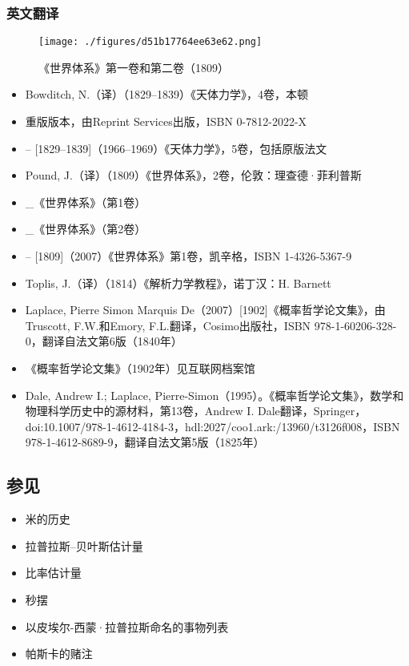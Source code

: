 \subsubsection{英文翻译}
\begin{figure}[ht]
\centering
\texttt{[image: ./figures/d51b17764ee63e62.png]}
\caption{《世界体系》第一卷和第二卷（1809）} \label{fig_LPLS_17}
\end{figure}  
\begin{itemize}
\item Bowditch, N.（译）（1829–1839）《天体力学》，4卷，本顿  
\item 重版版本，由Reprint Services出版，ISBN 0-7812-2022-X  
\item – [1829–1839]（1966–1969）《天体力学》，5卷，包括原版法文  
\item Pound, J.（译）（1809）《世界体系》，2卷，伦敦：理查德·菲利普斯  
\item _《世界体系》（第1卷）  
\item _《世界体系》（第2卷）  
\item – [1809]（2007）《世界体系》第1卷，凯辛格，ISBN 1-4326-5367-9  
\item Toplis, J.（译）（1814）《解析力学教程》，诺丁汉：H. Barnett  
\item Laplace, Pierre Simon Marquis De（2007）[1902]《概率哲学论文集》，由Truscott, F.W.和Emory, F.L.翻译，Cosimo出版社，ISBN 978-1-60206-328-0，翻译自法文第6版（1840年）  
\item 《概率哲学论文集》（1902年）见互联网档案馆  
\item Dale, Andrew I.; Laplace, Pierre-Simon（1995）。《概率哲学论文集》，数学和物理科学历史中的源材料，第13卷，Andrew I. Dale翻译，Springer，doi:10.1007/978-1-4612-4184-3，hdl:2027/coo1.ark:/13960/t3126f008，ISBN 978-1-4612-8689-9，翻译自法文第5版（1825年）
\end{itemize}
\subsection{参见}  
\begin{itemize}
\item 米的历史  
\item 拉普拉斯–贝叶斯估计量  
\item 比率估计量  
\item 秒摆  
\item 以皮埃尔-西蒙·拉普拉斯命名的事物列表  
\item 帕斯卡的赌注
\end{itemize}
